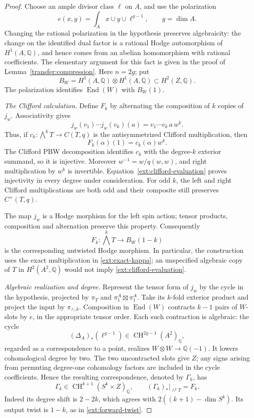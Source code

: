 \documentclass[11pt]{amsart}
\newcommand{\Q}{\mathbb Q}
\DeclareMathOperator{\CH}{CH}
\DeclareMathOperator{\End}{End}
\theoremstyle{definition}
\theoremstyle{remark}
\numberwithin{equation}{section}
\begin{document}
\begin{proof}
Choose an ample divisor class $\ell$ on $A$, and use the
polarization
\[
 e(x,y)=\int_Ax\cup y\cup\ell^{g-1},\qquad g=\dim A.
\]
Changing the rational polarization in the hypothesis preserves
algebraicity: the change on the identified dual factor is a rational
Hodge automorphism of $H^1(A,\Q)$, and hence comes from an abelian
homomorphism with rational coefficients.  The elementary argument for
this fact is given in the proof of Lemma~\ref{transfer:compression}.
Here $n=2g$; put
\[
 B_W=H^1(A,\Q)\otimes H^1(A,\Q)\subset H^2(Z,\Q).
\]
The polarization identifies $\End(W)$ with $B_W(1)$.

\emph{The Clifford calculation.}
Define $F_k$ by alternating the composition of $k$ copies of
$j_w$.  Associativity gives
\[
 j_w(v_1)\cdots j_w(v_k)(a)
       =v_1\cdots v_k\,a\,w^k.
\]
Thus, if $c_k:\bigwedge^kT\to C(T,q)$ is the antisymmetrized
Clifford multiplication, then
\begin{equation}\label{ext:clifford-evaluation}
 F_k(\alpha)(1)=c_k(\alpha)w^k.
\end{equation}
The Clifford PBW decomposition identifies $c_k$ with the degree-$k$
exterior summand, so it is injective.  Moreover
$w^{-1}=w/q(w,w)$, and right multiplication by $w^k$ is invertible.
Equation~\eqref{ext:clifford-evaluation} proves injectivity in every
degree under consideration.  For odd $k$, the left and right
Clifford multiplications are both odd and their composite still
preserves $C^+(T,q)$.

The map $j_w$ is a Hodge morphism for the left spin action;
tensor products, composition and alternation preserve this
property.  Consequently
\begin{equation}\label{ext:forward-twist}
 F_k:\bigwedge^kT\longrightarrow B_W(1-k)
\end{equation}
is the corresponding untwisted Hodge morphism.  In particular, the
construction uses the exact multiplication in
\eqref{ext:exact-kappa}; an unspecified algebraic copy of $T$ in
$H^2(A^2,\Q)$ would not imply
\eqref{ext:clifford-evaluation}.

\emph{Algebraic realization and degree.}
Represent the tensor form of $j_w$ by the cycle in the
hypothesis, projected by $\pi_T$ and $\pi_1^A\boxtimes\pi_1^A$.
Take its $k$-fold exterior product and project the input by
$\pi_{\wedge,k}$.  Composition in $\End(W)$ contracts $k-1$ pairs
of $W$-slots by $e$, in the appropriate tensor order.  Each such
contraction is algebraic: the cycle
\[
 (\Delta_A)_*(\ell^{g-1})\in\CH^{2g-1}(A^2)_{\Q},
\]
regarded as a correspondence to a point, realizes
$W\otimes W\to\Q(-1)$.  It lowers cohomological degree by two.
The two uncontracted slots give $Z$; any signs arising from
permuting degree-one cohomology factors are included in the cycle
coefficients.  Hence the resulting correspondence, denoted by
$\Gamma_k$, has
\begin{equation}\label{ext:forward-cycle}
 \Gamma_k\in\CH^{k+1}(S^k\times Z)_{\Q},\qquad
 (\Gamma_k)_*|_{\wedge^kT}=F_k.
\end{equation}
Indeed its degree shift is $2-2k$, which agrees with
$2((k+1)-\dim S^k)$.  Its output twist is $1-k$, as in
\eqref{ext:forward-twist}.


\end{proof}
\end{document}

